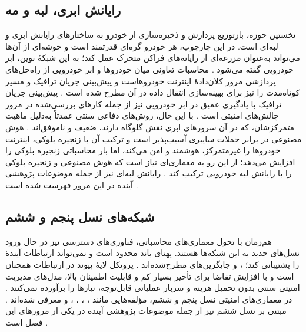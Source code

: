 \documentclass[12pt,a4paper]{article}
\begin{document}
\subsection{رایانش ابری، لبه و مه}
نخستین حوزه، بازتوزیع پردازش و ذخیره‌سازی از خودرو به ساختار‌های رایانش ابری و لبه‌ای است. در این چارچوب، هر خودرو گره‌ای قدرتمند است و خوشه‌ای از آن‌ها می‌تواند به‌عنوان مزرعه‌ای از رایانه‌های فرا‌کن متحرک عمل کند؛ به این شبکهٔ نوین، ابر خودرویی گفته می‌شود \cite{hozouriOverviewVANETVehicular2023}. محاسبات تعاونی میان خودرو‌ها و ابر خودرویی از راه‌حل‌های پردازشی مرور کلان‌دادهٔ اینترنت خودروهاست و پیش‌بینی جریان ترافیک و مسیر کوتاه‌مدت را نیز برای بهینه‌سازی انتقال داده در آن مطرح شده است \cite{xuInternetVehiclesBig2018}. پیش‌بینی جریان ترافیک با یادگیری عمیق در ابر خودرویی نیز از جمله کار‌های بررسی‌شده در مرور چالش‌های امنیتی است \cite{farsimadanReviewSecurityChallenges2025}. با این حال، روش‌های دفاعی سنتی عمدتاً به‌دلیل ماهیت متمرکزشان، که در آن سرور‌های ابری نقش گلوگاه دارند، ضعیف و ناموفق‌اند \cite{farsimadanReviewSecurityChallenges2025}. هوش مصنوعی در برابر حملات سایبری آسیب‌پذیر است و ترکیب آن با زنجیره بلوکی، اینترنت خودرو‌ها را غیرمتمرکز، هوشمند و امن می‌کند، اما بار محاسباتی زنجیره بلوکی را افزایش می‌دهد؛ از این رو به معماری‌ای نیاز است که هوش مصنوعی و زنجیره بلوکی را با رایانش لبه خودرویی ترکیب کند \cite{hozouriOverviewVANETVehicular2023}. رایانش لبه‌ای  نیز از جمله موضوعات پژوهشی آینده در این مرور فهرست شده است \cite{hozouriOverviewVANETVehicular2023}.

\subsection{شبکه‌های نسل پنجم و ششم}
هم‌زمان با تحول معماری‌های محاسباتی، فناوری‌های دسترسی نیز در حال ورود نسل‌های جدید به این شبکه‌ها هستند. پهنای باند  محدود است و نمی‌تواند ارتباطات آیندهٔ  را پشتیبانی کند؛ ،  و  جایگزین‌های مطرح‌شده‌اند \cite{farsimadanReviewSecurityChallenges2025}. پروتکل لایهٔ پیوند در ارتباطات  همچنان  است و با افزایش تقاضا برای تأخیر بسیار کم و قابلیت اطمینان بالا، مدل‌های مدیریت امنیتی سنتی بدون تحمیل هزینه و سربار عملیاتی قابل‌توجه، نیاز‌ها را برآورده نمی‌کنند \cite{farsimadanReviewSecurityChallenges2025}. در معماری‌های امنیتی نسل پنجم و ششم، مؤلفه‌هایی مانند ، ، ، ،  و  معرفی شده‌اند \cite{farsimadanReviewSecurityChallenges2025}.  مبتنی بر نسل ششم نیز از جمله موضوعات پژوهشی آینده در یکی از مرور‌های این فصل است \cite{hozouriOverviewVANETVehicular2023}.
\end{document}
